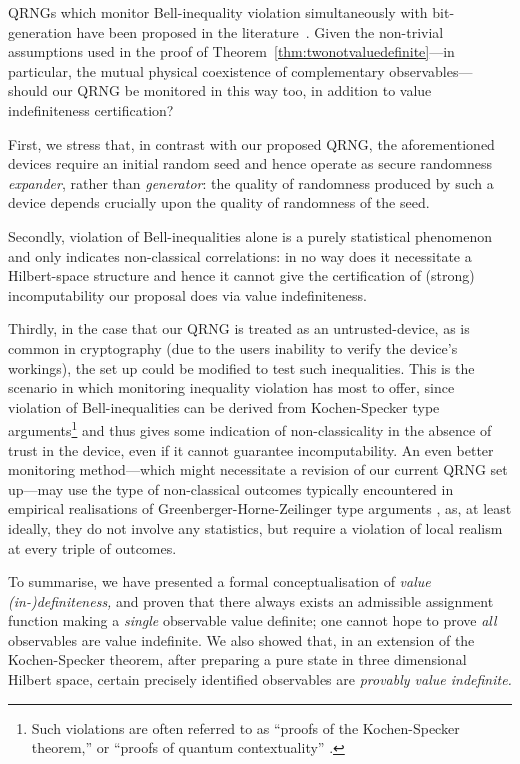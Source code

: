 \documentclass[%
 preprint,
 showpacs,
 showkeys,
 amsmath,
 amssymb,
 aps,
 pra,
 ]{revtex4-1}
\theoremstyle{definition}
\begin{document}
QRNGs which monitor Bell-inequality violation simultaneously with
bit-generation have been proposed in the literature~\cite{10.1038/nature09008,Vazirani28072012}.
Given the non-trivial assumptions used in the proof of  Theorem~\ref{thm:twonotvaluedefinite}---in particular, the mutual physical coexistence of
complementary observables---should our QRNG be monitored in this way too, in addition to  value indefiniteness certification?

First,  we stress that, in contrast with our proposed QRNG,  the aforementioned devices require an initial random seed and hence
operate as secure randomness {\em expander}, rather than {\em generator}: the quality
of randomness produced by such a device depends crucially upon the quality
of randomness of the seed.

Secondly, violation of Bell-inequalities alone is a purely statistical phenomenon and only
indicates non-classical correlations: in no way does it necessitate a Hilbert-space
structure and hence it cannot give the certification of (strong) incomputability
 our proposal does via value indefiniteness.

Thirdly, in the case that our QRNG is treated as an untrusted-device, as is common in
cryptography (due to the users inability to verify the device's workings), the set up
could be modified to test such inequalities. This is the scenario in which monitoring
inequality violation has most to offer, since violation of Bell-inequalities
can be derived from Kochen-Specker type arguments\footnote{Such violations are
often referred  to as ``proofs of the Kochen-Specker theorem,'' or ``proofs of quantum contextuality''
\cite{hasegawa:230401,Bartosik-09,kirch-09,PhysRevLett.103.160405,Lapkiewicz-11}.}
and thus gives some indication of non-classicality in the absence of trust in the device,
even if it cannot guarantee incomputability. An even better monitoring method---which might necessitate a revision of our current QRNG set up---may use the type of
non-classical outcomes typically encountered in empirical realisations of Greenberger-Horne-Zeilinger
type arguments \cite{PhysRevLett.82.1345,panbdwz}, as, at least ideally, they do not involve any statistics,
but require a violation of local realism  at every triple of outcomes.

To summarise, we have presented
a formal conceptualisation of {\em value (in-)definiteness,}
and proven that there always exists an admissible assignment function making a \emph{single} observable value definite; one cannot hope to prove \emph{all} observables are value indefinite.
We also showed that, in an extension of the Kochen-Specker theorem,
after preparing a pure state in three dimensional Hilbert space,
certain precisely identified observables are {\em provably value indefinite.}
\end{document}

